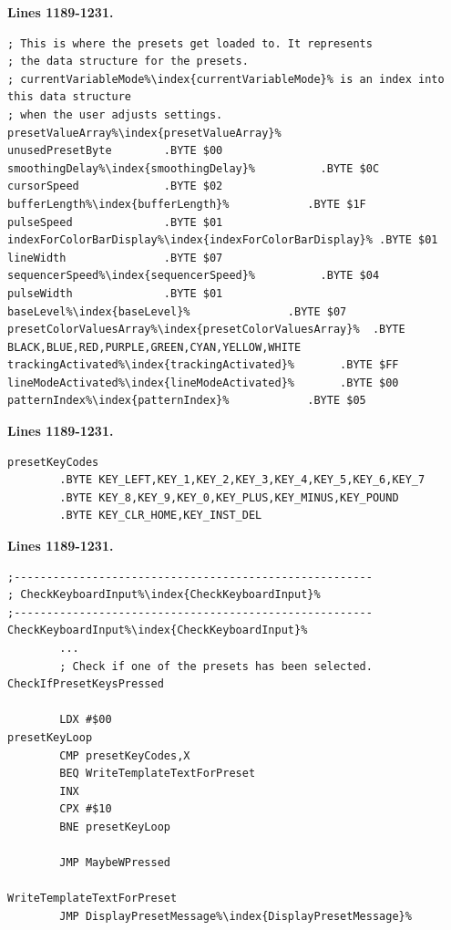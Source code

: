 \clearpage
\textbf{Lines 1189-1231. }
\begin{lstlisting}[escapechar=\%]
; This is where the presets get loaded to. It represents
; the data structure for the presets.
; currentVariableMode%\index{currentVariableMode}% is an index into this data structure
; when the user adjusts settings.
presetValueArray%\index{presetValueArray}%
unusedPresetByte        .BYTE $00
smoothingDelay%\index{smoothingDelay}%          .BYTE $0C
cursorSpeed             .BYTE $02
bufferLength%\index{bufferLength}%            .BYTE $1F
pulseSpeed              .BYTE $01
indexForColorBarDisplay%\index{indexForColorBarDisplay}% .BYTE $01
lineWidth               .BYTE $07
sequencerSpeed%\index{sequencerSpeed}%          .BYTE $04
pulseWidth              .BYTE $01
baseLevel%\index{baseLevel}%               .BYTE $07
presetColorValuesArray%\index{presetColorValuesArray}%  .BYTE BLACK,BLUE,RED,PURPLE,GREEN,CYAN,YELLOW,WHITE
trackingActivated%\index{trackingActivated}%       .BYTE $FF
lineModeActivated%\index{lineModeActivated}%       .BYTE $00
patternIndex%\index{patternIndex}%            .BYTE $05
\end{lstlisting}

\textbf{Lines 1189-1231. } 
\begin{lstlisting}[escapechar=\%]
presetKeyCodes
        .BYTE KEY_LEFT,KEY_1,KEY_2,KEY_3,KEY_4,KEY_5,KEY_6,KEY_7
        .BYTE KEY_8,KEY_9,KEY_0,KEY_PLUS,KEY_MINUS,KEY_POUND
        .BYTE KEY_CLR_HOME,KEY_INST_DEL
\end{lstlisting}
\textbf{Lines 1189-1231. } 
\begin{lstlisting}[escapechar=\%]
;-------------------------------------------------------
; CheckKeyboardInput%\index{CheckKeyboardInput}%
;-------------------------------------------------------
CheckKeyboardInput%\index{CheckKeyboardInput}%   
        ...
        ; Check if one of the presets has been selected.
CheckIfPresetKeysPressed   

        LDX #$00
presetKeyLoop   
        CMP presetKeyCodes,X
        BEQ WriteTemplateTextForPreset
        INX 
        CPX #$10
        BNE presetKeyLoop

        JMP MaybeWPressed

WriteTemplateTextForPreset   
        JMP DisplayPresetMessage%\index{DisplayPresetMessage}%
\end{lstlisting}
\clearpage

